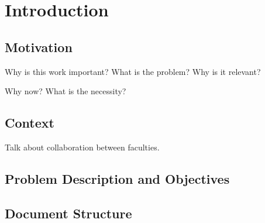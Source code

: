 
%

\chapter{Introduction}
\label{cha:introduction}

\section{Motivation}
\label{sec:motivation}

Why is this work important?
What is the problem?
Why is it relevant?

Why now?
What is the necessity?


\section{Context}
\label{sec:context}

Talk about collaboration between faculties.


\section{Problem Description and Objectives}
\label{sec:problem_description_and_objectives}



\section{Document Structure}
\label{sec:document_structure}